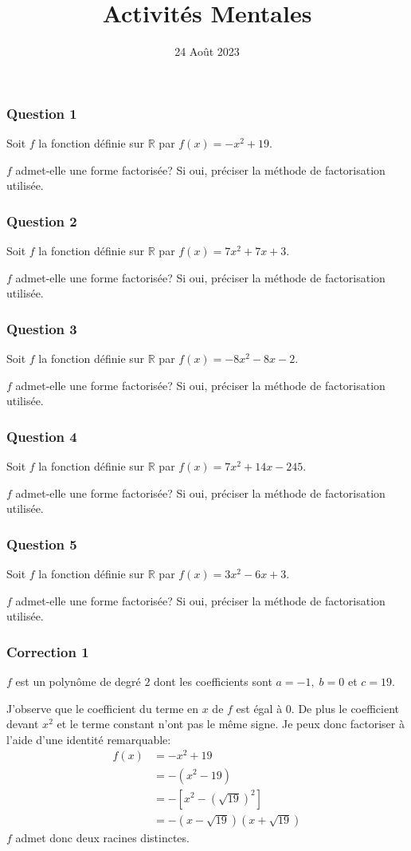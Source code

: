 \documentclass[15pt, mathserif]{beamer}
\title{Activités Mentales}
\date{24 Août 2023}
\begin{document}
\begin{frame}
    \titlepage
\end{frame}

\begin{frame} 
	\frametitle{Question 1}
Soit $f$ la fonction définie sur $\mathbb{R}$ par $f(x) = -x^2+19$. 

$f$ admet-elle une forme factorisée? Si oui, préciser la méthode de factorisation utilisée.\end{frame}


\begin{frame} 
	\frametitle{Question 2}
Soit $f$ la fonction définie sur $\mathbb{R}$ par $f(x) = 7x^2+7x+3$. 

$f$ admet-elle une forme factorisée? Si oui, préciser la méthode de factorisation utilisée.\end{frame}


\begin{frame} 
	\frametitle{Question 3}
Soit $f$ la fonction définie sur $\mathbb{R}$ par $f(x) = -8x^2-8x-2$. 

$f$ admet-elle une forme factorisée? Si oui, préciser la méthode de factorisation utilisée.\end{frame}


\begin{frame} 
	\frametitle{Question 4}
Soit $f$ la fonction définie sur $\mathbb{R}$ par $f(x) = 7x^2+14x-245$. 

$f$ admet-elle une forme factorisée? Si oui, préciser la méthode de factorisation utilisée.\end{frame}


\begin{frame} 
	\frametitle{Question 5}
Soit $f$ la fonction définie sur $\mathbb{R}$ par $f(x) = 3x^2-6x+3$. 

$f$ admet-elle une forme factorisée? Si oui, préciser la méthode de factorisation utilisée.\end{frame}


\begin{frame}
\vspace{-10mm}
	\frametitle{Correction 1}
$f$ est un polynôme de degré $2$ dont les coefficients sont $a =-1, \; b =0$ et $c =19$.
 
J'observe que le coefficient du terme en $x$ de $f$ est égal à $0$. De plus le coefficient devant $x^2$ et le terme constant n'ont pas le même signe. Je peux donc factoriser à l'aide d'une identité remarquable:
\begin{align*} f(x) &=-x^2+19\\ 
 &=-\left(x^2-19\right) \\ 
 &=-\left[x^2-\left(\sqrt{19}\right)^2\right] \\ 
 &=-\left(x-\sqrt{19}\right)\left(x+\sqrt{19}\right)\end{align*} $f$ admet donc deux racines distinctes.\end{frame}
\end{document}
